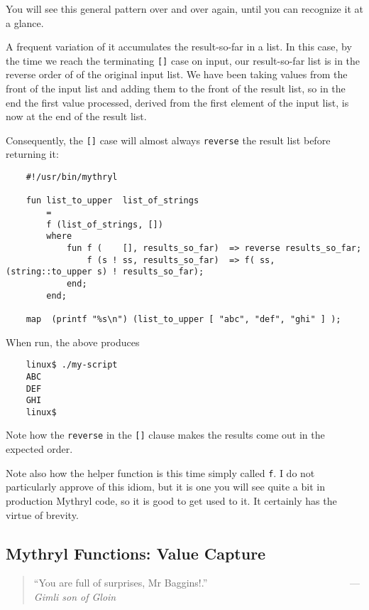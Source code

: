 You will see this general pattern over and over again, until you can 
recognize it at a glance.

A frequent variation of it accumulates the result-so-far in a list. 
In this case, by the time we reach the terminating {\tt []} case on 
input, our result-so-far list is in the reverse order of of the 
original input list.  We have been taking values from the 
front of the input list and adding them to the front of the 
result list, so in the end the first value processed, derived from 
the first element of the input list, is now at the end of the 
result list.

Consequently, the {\tt []} case will almost always {\tt reverse} the 
result list before returning it:

\begin{verbatim}
    #!/usr/bin/mythryl

    fun list_to_upper  list_of_strings
        =
        f (list_of_strings, [])
        where
            fun f (    [], results_so_far)  => reverse results_so_far;
                f (s ! ss, results_so_far)  => f( ss, (string::to_upper s) ! results_so_far);
            end;
        end;

    map  (printf "%s\n") (list_to_upper [ "abc", "def", "ghi" ] );
\end{verbatim}

When run, the above produces

\begin{verbatim}
    linux$ ./my-script
    ABC
    DEF
    GHI
    linux$
\end{verbatim}

Note how the {\tt reverse} in the {\tt []} clause makes the results come out 
in the expected order.  

Note also how the helper function is this time simply called {\tt f}.  
I do not particularly approve of this idiom, but it is one you will 
see quite a bit in production Mythryl code, so it is good to get 
used to it.  It certainly has the virtue of brevity.

\cutend*


\subsection{Mythryl Functions:  Value Capture}

\begin{quote}\begin{tiny}
       ``You are full of surprises, Mr Baggins!.''\newline
         ~~~~~~~~~~~~~~~~~~~~~~~~~~~~---{\em Gimli son of Gloin}
\end{tiny}\end{quote}

